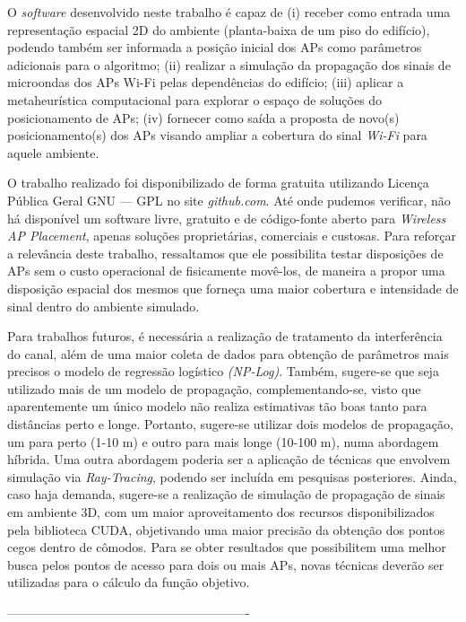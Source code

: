 \documentclass[
	12pt,				%
	openright,			%
	twoside,			%
	a4paper,			%
	english,			%
	french,				%
	spanish,			%
	brazil				%
	]{abntex2}
\begin{document}
O \textit{software} desenvolvido neste trabalho é capaz de (i) receber como entrada uma representação espacial 2D do ambiente (planta-baixa de um piso do edifício), podendo também ser informada a posição inicial dos APs como parâmetros adicionais para o algoritmo; (ii) realizar a simulação da propagação dos sinais de microondas dos APs Wi-Fi pelas dependências do edifício; (iii) aplicar a metaheurística computacional para explorar o espaço de soluções do posicionamento de APs; (iv) fornecer como saída a proposta de novo(s) posicionamento(s) dos APs visando ampliar a cobertura do sinal \textit{Wi-Fi} para aquele ambiente.

O trabalho realizado foi disponibilizado de forma gratuita utilizando Licença Pública Geral GNU — GPL no site \textit{github.com}.  Até onde pudemos verificar, não há disponível um software livre, gratuito e de código-fonte aberto para \textit{Wireless AP Placement}, apenas soluções proprietárias, comerciais e custosas. Para reforçar a relevância deste trabalho, ressaltamos que ele possibilita testar disposições de APs sem o custo operacional de fisicamente movê-los, de maneira a propor uma disposição espacial dos mesmos que forneça uma maior cobertura e intensidade de sinal dentro do ambiente simulado.

Para trabalhos futuros, é necessária a realização de tratamento da interferência do canal, além de uma maior coleta de dados para obtenção de parâmetros mais precisos o modelo de regressão logístico \textit{(NP-Log)}. Também, sugere-se que seja utilizado mais de um modelo de propagação, complementando-se, visto que aparentemente um único modelo não realiza estimativas tão boas tanto para distâncias perto e longe. Portanto, sugere-se utilizar dois modelos de propagação, um para perto (1-10 m) e outro para mais longe (10-100 m), numa abordagem híbrida. Uma outra abordagem poderia ser a aplicação de técnicas que envolvem simulação via \textit{Ray-Tracing}, podendo ser incluída em pesquisas posteriores. Ainda, caso haja demanda, sugere-se a realização de simulação de propagação de sinais em ambiente 3D, com um maior aproveitamento dos recursos disponibilizados pela biblioteca CUDA, objetivando uma maior precisão da obtenção dos pontos cegos dentro de cômodos. Para se obter resultados que possibilitem uma melhor busca pelos pontos de acesso para dois ou mais APs, novas técnicas deverão ser utilizadas para o cálculo da função objetivo. 


 ----------------------------------------------------------
\postextual
\end{document}
